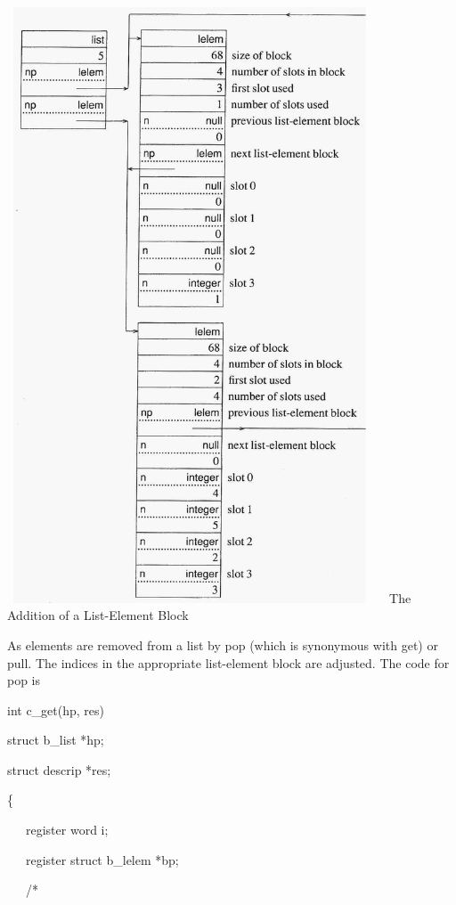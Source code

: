  \includegraphics[width=4.2752in,height=6.9661in]{ib-img/ib-img030.jpg} \newline
\ \ The Addition of a List-Element Block


As elements are removed from a list by pop (which is synonymous with
get) or pull. The indices in the appropriate list-element block are
adjusted. The code for pop is

{\ttfamily\mdseries
int c\_get(hp, res)}

{\ttfamily\mdseries
struct b\_list *hp;}

{\ttfamily\mdseries
struct descrip *res;}

{\ttfamily\mdseries
\{}

{\ttfamily\mdseries
\ \ \ register word i;}

{\ttfamily\mdseries
\ \ \ register struct b\_lelem *bp;}


\bigskip

{\ttfamily\mdseries
\ \ \ /*}

